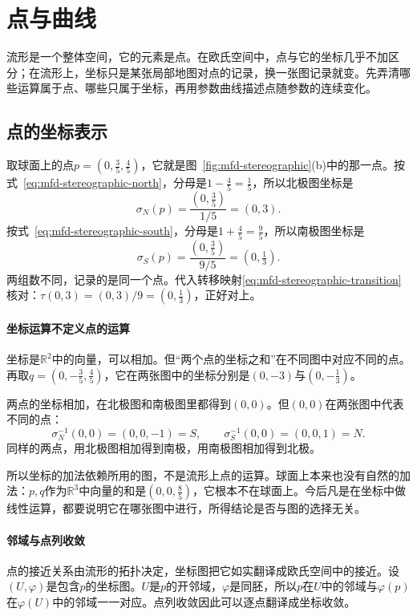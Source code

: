 \section{点与曲线}
\label{sec:mfd-points-curves}

流形是一个整体空间，它的元素是点。在欧氏空间中，点与它的坐标几乎不加区分；在流形上，坐标只是某张局部地图对点的记录，换一张图记录就变。先弄清哪些运算属于点、哪些只属于坐标，再用参数曲线描述点随参数的连续变化。

\subsection{点的坐标表示}
\label{sec:mfd-point-coordinates}

取球面上的点$p=(0,\tfrac35,\tfrac45)$，它就是图~\ref{fig:mfd-stereographic}(b)中的那一点。按式~\eqref{eq:mfd-stereographic-north}，分母是$1-\tfrac45=\tfrac15$，所以北极图坐标是
\[
\sigma_N(p)=\frac{(0,\tfrac35)}{1/5}=(0,3).
\]
按式~\eqref{eq:mfd-stereographic-south}，分母是$1+\tfrac45=\tfrac95$，所以南极图坐标是
\[
\sigma_S(p)=\frac{(0,\tfrac35)}{9/5}=(0,\tfrac13).
\]
两组数不同，记录的是同一个点。代入转移映射\eqref{eq:mfd-stereographic-transition}核对：$\tau(0,3)=(0,3)/9=(0,\tfrac13)$，正好对上。

\paragraph{坐标运算不定义点的运算}
坐标是$\mathbb R^2$中的向量，可以相加。但“两个点的坐标之和”在不同图中对应不同的点。再取$q=(0,-\tfrac35,\tfrac45)$，它在两张图中的坐标分别是$(0,-3)$与$(0,-\tfrac13)$。

两点的坐标相加，在北极图和南极图里都得到$(0,0)$。但$(0,0)$在两张图中代表不同的点：
\[
\sigma_N^{-1}(0,0)=(0,0,-1)=S,\qquad
\sigma_S^{-1}(0,0)=(0,0,1)=N .
\]
同样的两点，用北极图相加得到南极，用南极图相加得到北极。

所以坐标的加法依赖所用的图，不是流形上点的运算。球面上本来也没有自然的加法：$p,q$作为$\mathbb R^3$中向量的和是$(0,0,\tfrac85)$，它根本不在球面上。今后凡是在坐标中做线性运算，都要说明它在哪张图中进行，所得结论是否与图的选择无关。

\paragraph{邻域与点列收敛}
点的接近关系由流形的拓扑决定，坐标图把它如实翻译成欧氏空间中的接近。设$(U,\varphi)$是包含$p$的坐标图。$U$是$p$的开邻域，$\varphi$是同胚，所以$p$在$U$中的邻域与$\varphi(p)$在$\varphi(U)$中的邻域一一对应。点列收敛因此可以逐点翻译成坐标收敛。

